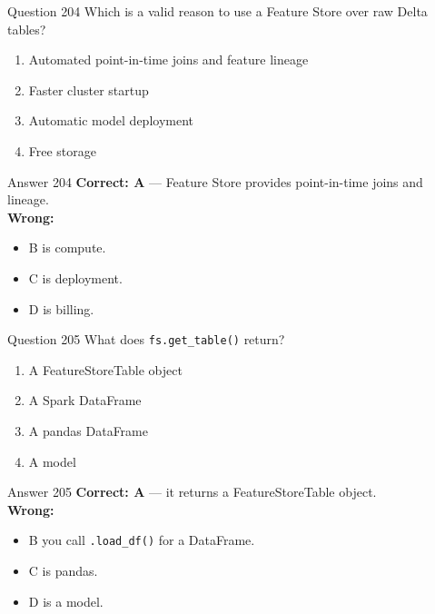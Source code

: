 \documentclass[aspectratio=169,11pt]{beamer}
\begin{document}
	\begin{frame}{Question 204}
		Which is a valid reason to use a Feature Store over raw Delta tables?
		\begin{enumerate}[label=\Alph*.]
			\item Automated point-in-time joins and feature lineage
			\item Faster cluster startup
			\item Automatic model deployment
			\item Free storage
		\end{enumerate}
	\end{frame}
	\begin{frame}{Answer 204}
		\textbf{Correct: A} --- Feature Store provides point-in-time joins and lineage.\\
		\vspace{0.5em}
		\textbf{Wrong:}
		\begin{itemize}
			\item B is compute.
			\item C is deployment.
			\item D is billing.
		\end{itemize}
	\end{frame}
	
	\begin{frame}{Question 205}
		What does \texttt{fs.get\_table()} return?
		\begin{enumerate}[label=\Alph*.]
			\item A FeatureStoreTable object
			\item A Spark DataFrame
			\item A pandas DataFrame
			\item A model
		\end{enumerate}
	\end{frame}
	\begin{frame}{Answer 205}
		\textbf{Correct: A} --- it returns a FeatureStoreTable object.\\
		\vspace{0.5em}
		\textbf{Wrong:}
		\begin{itemize}
			\item B you call \texttt{.load\_df()} for a DataFrame.
			\item C is pandas.
			\item D is a model.
		\end{itemize}
	\end{frame}
	
\end{document}
